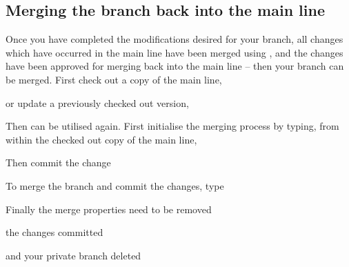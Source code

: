 \subsection{Merging the branch back into the main line}

Once you have completed the modifications desired for your branch, all changes which have occurred in the main line have been merged using , and the changes have been approved for merging back into the main line -- then your branch can be merged.  First check out a copy of the main line,


or update a previously checked out version,


Then  can be utilised again.  First initialise the merging process by typing, from within the checked out copy of the main line, 


Then commit the change


To merge the branch and commit the changes, type



Finally the merge properties need to be removed


the changes committed


and your private branch deleted





